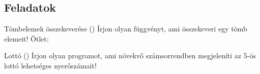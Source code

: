 \subsection{Feladatok}

\begin{frame}
  \begin{exampleblock}{Tömbelemek összekeverése ()}
    Írjon olyan függvényt, ami összekeveri egy tömb elemeit! Ötlet: 
  \end{exampleblock}
  \vfill
  \begin{exampleblock}{Lottó ()}
    Írjon olyan programot, ami növekvő számsorrendben megjeleníti az 5-ös lottó lehetséges nyerőszámait!
  \end{exampleblock}
\end{frame}